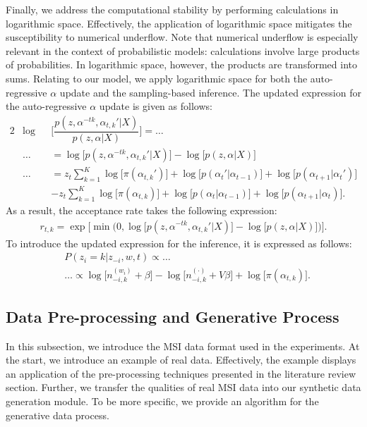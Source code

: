 \documentclass{mpaper}
\begin{document}
\par Finally, we address the computational stability by performing calculations in logarithmic space. Effectively, the application of logarithmic space mitigates the susceptibility to numerical underflow. Note that numerical underflow is especially relevant in the context of probabilistic models: calculations involve large products of probabilities. In logarithmic space, however, the products are transformed into sums. Relating to our model, we apply logarithmic space for both the auto-regressive $\alpha$ update and the sampling-based inference. The updated expression for the auto-regressive $\alpha$ update is given as follows:
\begin{alignat*}{2}
  &\log&&\bigg[{\dfrac{p(z,\alpha^{-tk},\alpha_{t, k}'|X)}{p(z,\alpha|X)}}\bigg] = \ldots \\
  & \ldots && = \log\big[{p(z,\alpha^{-tk},\alpha_{t, k}'|X)}\big] - \log\big[{p(z,\alpha|X)}\big]\\
  & \ldots && = z_{t}\sum_{k=1}^K\log\big[\pi(\alpha_{t,k}')\big] + \log\big[p(\alpha_t'|\alpha_{t-1})\big] + \log\big[p(\alpha_{t+1}|\alpha_t')\big]\\
  & && - z_{t}\sum_{k=1}^K\log\big[\pi(\alpha_{t, k})\big] + \log\big[p(\alpha_t|\alpha_{t-1})\big] + \log\big[p(\alpha_{t+1}|\alpha_t)\big].
\end{alignat*}
As a result, the acceptance rate takes the following expression:
\begin{align*}
	r_{t,k} = \exp\big[\min{\big(0, \log\big[{p(z,\alpha^{-tk},\alpha_{t, k}'|X)}\big] - \log\big[{p(z,\alpha|X)}\big]}\big)\big].
\end{align*}
To introduce the updated expression for the inference, it is expressed as follows:
\begin{align*}
&P(z_i = k | z_{-i}, w, t) \propto \ldots\\
&\ldots \propto \log\big[n_{-i, k}^{(w_i)} + \beta\big] - \log\big[n_{-i, k}^{(\cdot)} + V\beta\big] + \log\big[\pi(\alpha_{t,k})\big].
\end{align*}

\subsection{Data Pre-processing and Generative Process}

\par In this subsection, we introduce the MSI data format used in the experiments. At the start, we introduce an example of real data. Effectively, the example displays an application of the pre-processing techniques presented in the literature review section. Further, we transfer the qualities of real MSI data into our synthetic data generation module. To be more specific, we provide an algorithm for the generative data process.
\end{document}
